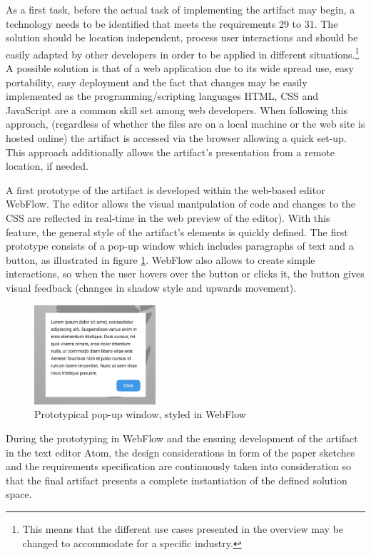 As a first task, before the actual task of implementing the artifact may begin, a technology needs to be identified that meets the requirements 29 to 31. The solution should be location independent, process user interactions and should be easily adapted by other developers in order to be applied in different situations.\footnote{This means that the different use cases presented in the overview may be changed to accommodate for a specific industry.} A possible solution is that of a web application due to its wide spread use, easy portability, easy deployment and the fact that changes may be easily implemented as the programming/scripting languages HTML, CSS and JavaScript are a common skill set among web developers. When following this approach, (regardless of whether the files are on a local machine or the web site is hosted online) the artifact is accessed via the browser allowing a quick set-up. This approach additionally allows the artifact's presentation from a remote location, if needed.

A first prototype of the artifact is developed within the web-based editor WebFlow. The editor allows the visual manipulation of code and changes to the CSS are reflected in real-time in the web preview of the editor). With this feature, the general style of the artifact's elements is quickly defined. The first prototype consists of a pop-up window which includes paragraphs of text and a button, as illustrated in figure \ref{fig:proto1}. WebFlow also allows to create simple interactions, so when the user hovers over the button or clicks it, the button gives visual feedback (changes in shadow style and upwards movement).

\begin{figure}
    \centering
    \includegraphics[width=0.4\textwidth]{latex-vorlage_v1.5/graphics/Prototype1.png}
    \caption{Prototypical pop-up window, styled in WebFlow}
    \label{fig:proto1}
\end{figure}

During the prototyping in WebFlow and the ensuing development of the artifact in the text editor Atom, the design considerations in form of the paper sketches and the requirements specification are continuously taken into consideration so that the final artifact presents a complete instantiation of the defined solution space.

